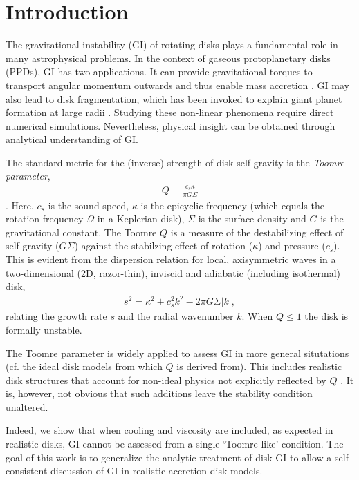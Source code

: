 \documentclass[iop, numberedappendix]{emulateapj}
\begin{document}
\section{Introduction}\label{intro} 
The gravitational instability (GI) of rotating disks    
plays a fundamental role in many astrophysical problems. In the context of 
gaseous protoplanetary disks (PPDs), GI has two applications. It can  
provide gravitational torques to transport angular momentum outwards
and thus enable mass accretion \citep{armitage10,turner14}.   
GI may also lead to disk fragmentation, which has been invoked to 
explain giant planet formation at large radii
\citep{helled14}. Studying these non-linear phenomena require direct      
numerical simulations. Nevertheless, physical insight can be  
obtained through analytical understanding of GI. 

The standard metric for the (inverse) strength of disk self-gravity is
the \emph{Toomre parameter}, 
\begin{align}\label{toomreQ_criterion}
  Q \equiv \frac{c_s\kappa}{\pi G \Sigma}  
\end{align}
\citep{toomre64}. Here, $c_s$ is the sound-speed,
$\kappa$ is the epicyclic frequency (which equals the rotation
frequency $\Omega$ in a Keplerian disk), $\Sigma$ is the surface
density and $G$ is the gravitational constant. The Toomre $Q$ is a
measure of the destabilizing effect of self-gravity ($G\Sigma$) against 
the stabilzing effect of rotation ($\kappa$) and pressure 
($c_s$). This is evident from the dispersion relation for local,
axisymmetric waves in a two-dimensional (2D, razor-thin), 
inviscid and adiabatic (including isothermal) disk, 
\begin{align} 
  s^2 = \kappa^2 + c_s^2k^2 - 2\pi G\Sigma|k|, 
\end{align}
relating the growth rate $s$ and the radial wavenumber $k$. When
$Q\leq 1$ the disk is formally unstable. 


The Toomre parameter is widely applied to assess GI in more general 
situtations (cf. the ideal disk models from which $Q$ is derived
from). This includes realistic disk structures 
that account for non-ideal physics not 
explicitly reflected by $Q$ \citep[e.g.][]{kimura12}.  It is, however,
not obvious that such additions leave the stability condition
unaltered. 

Indeed, we show that when cooling and viscosity are  
included, as expected in realistic disks, GI cannot be assessed from a
single `Toomre-like' condition.      
The goal of this work is to generalize the analytic treatment of disk 
GI to allow a self-consistent discussion of GI in realistic accretion 
disk models. 
\end{document}
